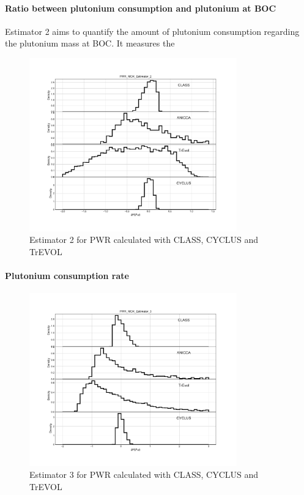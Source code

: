 \paragraph{Ratio between plutonium consumption and plutonium at BOC}
Estimator 2 aims to quantify the amount of plutonium consumption regarding the plutonium mass at BOC. It measures the 
\begin{figure}[h]
	\begin{center}
		\includegraphics[width = 0.8\textwidth]{../../Feature_1/RAW_DATA/FIG/PWR_MOX_Estimator_2.pdf}
		\caption{Estimator 2 for PWR calculated with CLASS, CYCLUS and TrEVOL}
		\label{fig:Est2_PWR}
	\end{center}
\end{figure}


\paragraph{Plutonium consumption rate}
\begin{figure}[h]
	\begin{center}
		\includegraphics[width = 0.8\textwidth]{../../Feature_1/RAW_DATA/FIG/PWR_MOX_Estimator_3.pdf}
		\caption{Estimator 3 for PWR calculated with CLASS, CYCLUS and TrEVOL}
		\label{fig:Est3_PWR}
	\end{center}
\end{figure}

